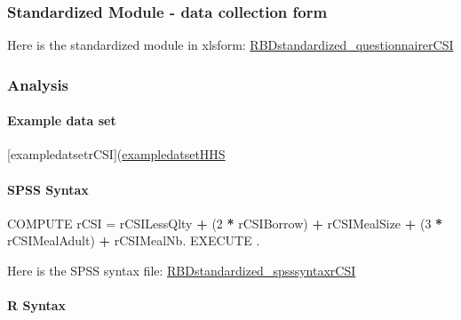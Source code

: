 \documentclass[
]{article}
\newenvironment{Shaded}{\begin{snugshade}}{\end{snugshade}}
\newcommand{\DecValTok}[1]{\textcolor[rgb]{0.00,0.00,0.81}{#1}}
\newcommand{\NormalTok}[1]{#1}
\newcommand{\OperatorTok}[1]{\textcolor[rgb]{0.81,0.36,0.00}{\textbf{#1}}}
\newcommand{\StringTok}[1]{\textcolor[rgb]{0.31,0.60,0.02}{#1}}
\begin{document}
\hypertarget{standardized-module---data-collection-form}{%
\subsubsection{Standardized Module - data collection form}\label{standardized-module---data-collection-form}}

Here is the standardized module in xlsform: \href{https://www.dropbox.com/s/gsj4tvadww9v3q4/RBDstandardized_questionnairerCSI.xlsx?dl=0}{RBDstandardized\_questionnairerCSI}

\hypertarget{analysis}{%
\subsubsection{Analysis}\label{analysis}}

\hypertarget{example-data-set}{%
\paragraph{Example data set}\label{example-data-set}}

{[}exampledatsetrCSI{]}(\href{https://www.dropbox.com/sh/g2s87u60cc0yx6v/AABdYDfCkJlyP1DlgRoEc0gDa?dl=0}{exampledatsetHHS}

\hypertarget{spss-syntax}{%
\paragraph{SPSS Syntax}\label{spss-syntax}}

\begin{Shaded}
\begin{Highlighting}[]
\NormalTok{COMPUTE rCSI =}\StringTok{ }\NormalTok{rCSILessQlty  }\OperatorTok{+}\StringTok{ }\NormalTok{(}\DecValTok{2} \OperatorTok{*}\StringTok{ }\NormalTok{rCSIBorrow) }\OperatorTok{+}\StringTok{ }\NormalTok{rCSIMealSize }\OperatorTok{+}\StringTok{ }\NormalTok{(}\DecValTok{3} \OperatorTok{*}\StringTok{ }\NormalTok{rCSIMealAdult) }\OperatorTok{+}\StringTok{ }\NormalTok{rCSIMealNb.}
\NormalTok{EXECUTE .}
\end{Highlighting}
\end{Shaded}

Here is the SPSS syntax file:
\href{https://www.dropbox.com/s/gsj4tvadww9v3q4/RBDstandardized_questionnairerCSI.xlsx?dl=0}{RBDstandardized\_spsssyntaxrCSI}

\hypertarget{r-syntax}{%
\paragraph{R Syntax}\label{r-syntax}}
\end{document}
